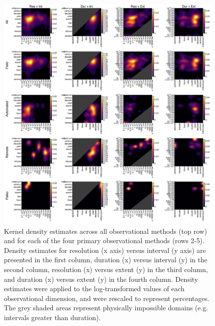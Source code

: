 \documentclass[12pt]{article}
\begin{document}
\begin{figure}[!ht]
\includegraphics[width=1\textwidth]{../vignettes/figures/figS2.png}
\vspace{-20 pt}
\caption{Kernel density estimates across all observational methods (top row) and for each of the four primary observational methods (rows 2-5). Density estimates for resolution (x axis) versus interval (y axis) are presented in the first column, duration (x) versus interval (y) in the second column, resolution (x) versus extent (y) in the third column, and duration (x) versus extent (y) in the fourth column. Density estimates were applied to the log-transformed values of each observational dimension, and were rescaled to represent percentages. The grey shaded areas represent physically impossible domains (e.g. intervals greater than duration).}
\label{obskde}
\end{figure}
\end{document}
